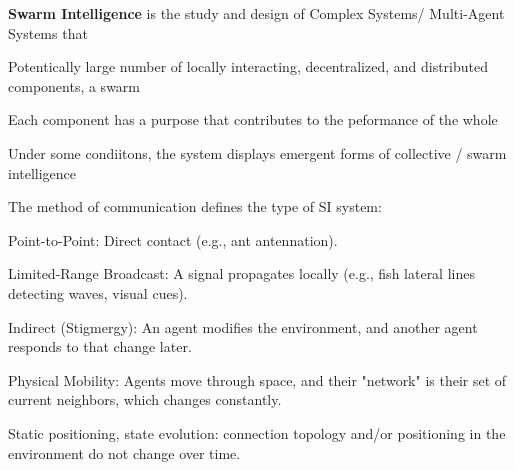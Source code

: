 \textbf{Swarm Intelligence} is the study and design of Complex Systems/ 
Multi-Agent Systems that 
\begin{tightitemize}
    \item Potentically large number of locally interacting, decentralized,
    and distributed components, a swarm 
    \item Each component has a purpose that contributes to the peformance of 
    the whole
    \item Under some condiitons, the system displays emergent forms of 
    collective / swarm intelligence
\end{tightitemize}

The method of communication defines the type of SI system:

\begin{tightitemize}
    \item Point-to-Point: Direct contact (e.g., ant antennation).
    \item Limited-Range Broadcast: A signal propagates locally (e.g., fish lateral lines detecting waves, visual cues).
    \item Indirect (Stigmergy): An agent modifies the environment, and another agent responds to that change later.
    \item Physical Mobility: Agents move through space,
    and their "network" is their set of current neighbors, which changes constantly.
    \item Static positioning, state evolution: connection topology and/or 
    positioning in the environment do not change over time.
\end{tightitemize}
    
    